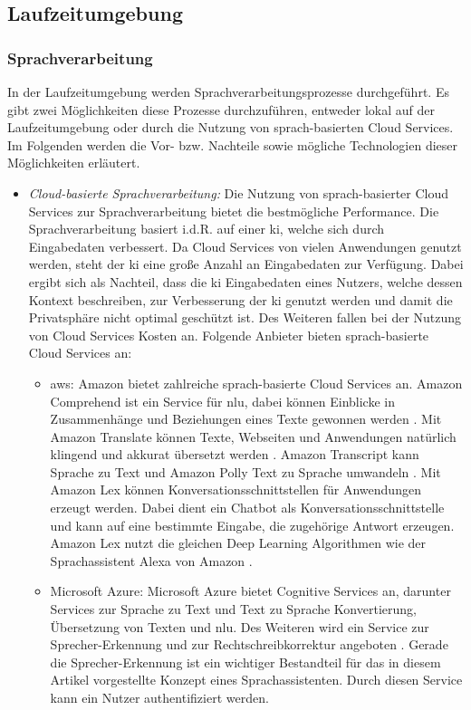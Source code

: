 \subsection{Laufzeitumgebung}
\subsubsection{Sprachverarbeitung}
In der Laufzeitumgebung werden Sprachverarbeitungsprozesse durchgeführt. Es gibt zwei Möglichkeiten diese Prozesse durchzuführen, entweder lokal auf der Laufzeitumgebung oder durch die Nutzung von sprach-basierten Cloud Services. Im Folgenden werden die Vor- bzw. Nachteile sowie mögliche Technologien dieser Möglichkeiten erläutert.
\begin{itemize}
	\item \textsl{Cloud-basierte Sprachverarbeitung:} Die Nutzung von sprach-basierter Cloud Services zur Sprachverarbeitung bietet die bestmögliche Performance. Die Sprachverarbeitung basiert i.d.R. auf einer \ac{ki}, welche sich durch Eingabedaten verbessert. Da Cloud Services von vielen Anwendungen genutzt werden, steht der \ac{ki} eine große Anzahl an Eingabedaten zur Verfügung. Dabei ergibt sich als Nachteil, dass die \ac{ki} Eingabedaten eines Nutzers, welche dessen Kontext beschreiben, zur Verbesserung der \ac{ki} genutzt werden und damit die Privatsphäre nicht optimal geschützt ist. Des Weiteren fallen bei der Nutzung von Cloud Services Kosten an. Folgende Anbieter bieten sprach-basierte Cloud Services an:
	\begin{itemize}
		\item \ac{aws}: Amazon bietet zahlreiche sprach-basierte Cloud Services an. Amazon Comprehend ist ein Service für \ac{nlu}, dabei können Einblicke in Zusammenhänge und Beziehungen eines Texte gewonnen werden \cite{AmazonComprehed}. Mit Amazon Translate können Texte, Webseiten und Anwendungen natürlich klingend und akkurat übersetzt werden \cite{AmazonTranslate}. Amazon Transcript kann Sprache zu Text und Amazon Polly Text zu Sprache umwandeln \cite{AmazonTranscript} \cite{AmazonPolly}. Mit Amazon Lex können Konversationsschnittstellen für Anwendungen erzeugt werden. Dabei dient ein Chatbot als Konversationsschnittstelle und kann auf eine bestimmte Eingabe, die zugehörige Antwort erzeugen. Amazon Lex nutzt die gleichen Deep Learning Algorithmen wie der Sprachassistent Alexa von Amazon \cite{AmazonLex}.
		\item Microsoft Azure: Microsoft Azure bietet Cognitive Services an, darunter Services zur Sprache zu Text und Text zu Sprache Konvertierung, Übersetzung von Texten und \ac{nlu}. Des Weiteren wird ein Service zur Sprecher-Erkennung und zur Rechtschreibkorrektur angeboten \cite{MicrosoftAzureCognitiveServices}. Gerade die Sprecher-Erkennung ist ein wichtiger Bestandteil für das in diesem Artikel vorgestellte Konzept eines Sprachassistenten. Durch diesen Service kann ein Nutzer authentifiziert werden.  

\end{itemize}
\end{itemize}
